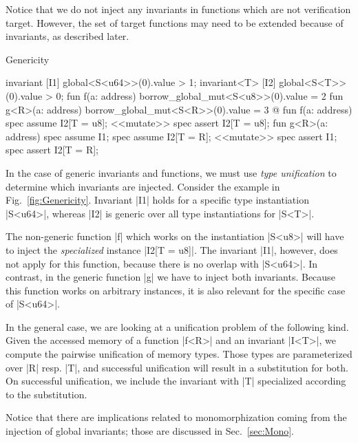 Notice that we do not inject any invariants in functions which are not
verification target. However, the set of target functions may need to be
extended because of invariants, as described later.



\begin{Figure}
  \caption{Genericity}
  \label{fig:Genericity}
  \centering
\begin{MoveBox}
  invariant [I1] global<S<u64>>(0).value > 1;
  invariant<T> [I2] global<S<T>>(0).value > 0;
  fun f(a: address) { borrow_global_mut<S<u8>>(0).value = 2 }
  fun g<R>(a: address) { borrow_global_mut<S<R>>(0).value = 3 }
  @\transform@
  fun f(a: address) {
    spec assume I2[T = u8];
    <<mutate>>
    spec assert I2[T = u8];
  }
  fun g<R>(a: address) {
    spec assume I1;
    spec assume I2[T = R];
    <<mutate>>
    spec assert I1;
    spec assert I2[T = R];
  }
\end{MoveBox}
\end{Figure}

In the case of generic invariants and functions, we must use \emph{type
  unification} to determine which invariants are injected. Consider the example
in Fig.~\ref{fig:Genericity}. Invariant |I1| holds for a specific type
instantiation |S<u64>|, whereas |I2| is generic over all type instantiations for
|S<T>|.

The non-generic function |f| which works on the instantiation |S<u8>| will have
to inject the \emph{specialized} instance |I2[T = u8]|. The invariant |I1|,
however, does not apply for this function, because there is no overlap with
|S<u64>|.  In contrast, in the generic function |g| we have to inject both
invariants. Because this function works on arbitrary instances, it is also
relevant for the specific case of |S<u64>|.

In the general case, we are looking at a unification problem of the following
kind. Given the accessed memory of a function |f<R>| and an invariant |I<T>|, we
compute the pairwise unification of memory types. Those types are parameterized
over |R| resp. |T|, and successful unification will result in a substitution
for both. On successful unification, we include the invariant with |T| specialized
according to the substitution.

Notice that there are implications related to monomorphization coming from the
injection of global invariants; those are discussed in Sec.~\ref{sec:Mono}.



